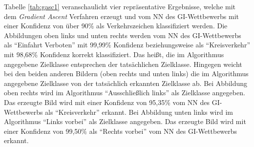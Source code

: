Tabelle \ref{tab:gasc1} veranschaulicht vier repräsentative Ergebnisse, welche mit dem \textit{Gradient Ascent} Verfahren erzeugt und vom \ac{NN} des \ac{GI}-Wettbewerbs mit einer Konfidenz von über 90\% als Verkehrszeichen klassifiziert werden. Die Abbildungen oben links und unten rechts werden vom \ac{NN} des \ac{GI}-Wettbewerbs als "`Einfahrt Verboten"' mit 99,99\% Konfidenz beziehungsweise als "`Kreisverkehr"' mit 98,68\% Konfidenz korrekt klassifiziert. 
Das heißt, die im Algorithmus angegebene Zielklasse entsprechen der tatsächlichen Zielklasse.
Hingegen weicht bei den beiden anderen Bildern (oben rechts und unten links) die im Algorithmus angegebene Zielklasse von der tatsächlich erkannten Zielklasse ab. 
Bei Abbildung oben rechts wird im Algorithmus "`Ausschließlich links"' als Zielklasse angegeben. Das erzeugte Bild wird mit einer Konfidenz von 95,35\% vom \ac{NN} des \ac{GI}-Wettbewerbs als "`Kreisverkehr"' erkannt.
Bei Abbildung unten links wird im Algorithmus "`Links vorbei"' als Zielklasse angegeben. Das erzeugte Bild wird mit einer Konfidenz von 99,50\% als "`Rechts vorbei"' vom \ac{NN} des \ac{GI}-Wettbewerbs erkannt.


